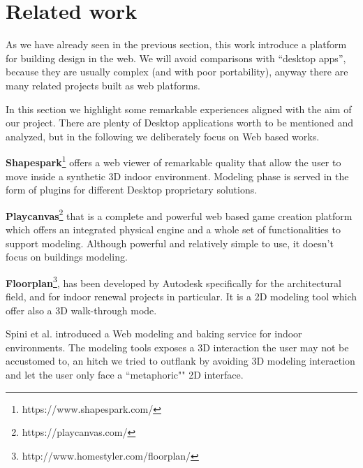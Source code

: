 \section{Related work}\label{sec:related_work}

As we have already seen in the previous section, this work introduce a platform for building design in the web. We will avoid comparisons with ``desktop apps'', because they are usually complex (and with poor portability), anyway there are many related projects built as web platforms. 

In this section we highlight some remarkable experiences aligned with the aim of our project. There are plenty of Desktop applications worth to be mentioned and analyzed, but in the following we deliberately focus on Web based works. 

\textbf{Shapespark}\footnote{https://www.shapespark.com/} offers a web viewer of remarkable quality that allow the user to move inside a synthetic 3D indoor environment. Modeling phase is served in the form of plugins for different Desktop proprietary solutions.

\textbf{Playcanvas}\footnote{https://playcanvas.com/} that is a complete and powerful web based game creation platform which offers an integrated physical engine and a whole set of functionalities to support modeling. Although powerful and relatively simple to use, it doesn't focus on buildings modeling.

\textbf{Floorplan}\footnote{http://www.homestyler.com/floorplan/}, has been developed by Autodesk specifically for the architectural field, and for indoor renewal projects in particular. It is a 2D modeling tool which offer also a 3D walk-through mode.

Spini et al. \cite{Spini:2016:WIA:2945292.2945309} introduced a Web modeling and baking service for indoor environments. The modeling tools exposes a 3D interaction the user may not be accustomed to, an hitch we tried to outflank by avoiding 3D modeling interaction and let the user only face a ``metaphoric"" 2D interface.
